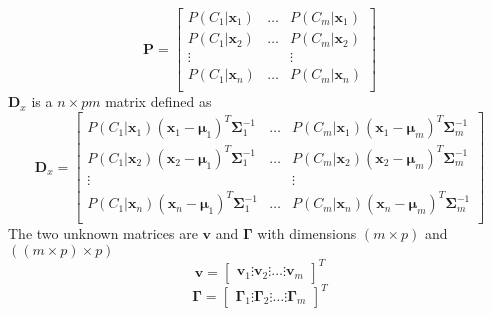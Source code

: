\begin{equation}
	\mathbf{P} = \begin{bmatrix}
		P(C_1\vert \mathbf{x}_1) & \dots & P(C_m\vert \mathbf{x}_1) \\
		P(C_1\vert \mathbf{x}_2) & \dots & P(C_m\vert \mathbf{x}_2) \\
		\vdots & & \vdots \\
		P(C_1\vert \mathbf{x}_n) & \dots & P(C_m\vert \mathbf{x}_n) \\
	\end{bmatrix}
\end{equation}
$\mathbf{D}_x$ is a $n \times pm$ matrix defined as
\begin{equation}
	\mathbf{D}_x = \begin{bmatrix}
		P(C_1\vert \mathbf{x}_1)(\mathbf{x}_1 - \boldsymbol{\mu}_1)^T\mathbf{\Sigma}_1^{-1} & \dots & P(C_m\vert \mathbf{x}_1)(\mathbf{x}_1 - \boldsymbol{\mu}_m)^T\mathbf{\Sigma}_m^{-1} \\
		P(C_1\vert \mathbf{x}_2)(\mathbf{x}_2 - \boldsymbol{\mu}_1)^T\mathbf{\Sigma}_1^{-1} & \dots & P(C_m\vert \mathbf{x}_2)(\mathbf{x}_2 - \boldsymbol{\mu}_m)^T\mathbf{\Sigma}_m^{-1} \\
		\vdots & & \vdots \\
		P(C_1\vert \mathbf{x}_n)(\mathbf{x}_n - \boldsymbol{\mu}_1)^T\mathbf{\Sigma}_1^{-1} & \dots & P(C_m\vert \mathbf{x}_n)(\mathbf{x}_n - \boldsymbol{\mu}_m)^T\mathbf{\Sigma}_m^{-1} \\
	\end{bmatrix}
\end{equation}
The two unknown matrices are $\mathbf{v}$ and $ \mathbf{\Gamma}$ with dimensions $(m\times p)$ and $((m\times p) \times p)$ 
\begin{equation}
	\mathbf{v} = 
	\begin{bmatrix}
		\mathbf{v}_1 \vdots \mathbf{v}_2 \vdots \dots \vdots \mathbf{v}_m
	\end{bmatrix}^T
\end{equation}
\begin{equation}
	\mathbf{\Gamma} = 
	\begin{bmatrix}
		\mathbf{\Gamma}_1 \vdots \mathbf{\Gamma}_2 \vdots \dots \vdots \mathbf{\Gamma}_m
	\end{bmatrix}^T
\end{equation}
